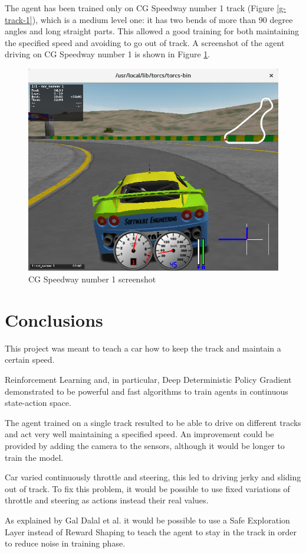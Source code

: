 \documentclass[Lau,oneside,noexaminfo]{sapthesis} %
\begin{document}
The agent has been trained only on CG Speedway number 1 track (Figure \ref{g-track-1}), which is a medium level one: it has two bends of more than 90 degree angles and long straight parts. This allowed a good training for both maintaining the specified speed and avoiding to go out of track.
A screenshot of the agent driving on CG Speedway number 1 is shown in Figure \ref{screenshot}.
\begin{figure}[H]
  \centering
  \includegraphics[width=.8\textwidth]{screenshot}
  \caption{CG Speedway number 1 screenshot}
  \label{screenshot}
\end{figure}
\chapter{Conclusions}
This project was meant to teach a car how to keep the track and maintain a certain speed. 

Reinforcement Learning and, in particular, Deep Deterministic Policy Gradient demonstrated to be powerful and fast algorithms to train agents in continuous state-action space.  

The agent trained on a single track resulted to be able to drive on different tracks and act very well maintaining  a specified speed. An improvement could be provided by adding the camera to the sensors, although it would be longer to train the model.

Car varied continuously throttle and steering, this led to driving jerky and sliding out of track. To fix this problem, it would be possible to use fixed variations of throttle and steering as actions instead their real values.

As explained by Gal Dalal et al. \cite{SAFEEXPLORATION} it would be possible to use a Safe Exploration Layer instead of Reward Shaping to teach the agent to stay in the track in order to reduce noise in training phase.
\end{document}
